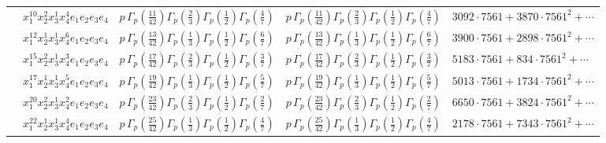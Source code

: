 \documentclass[11pt]{article}
\begin{document}
\begin{table}[ht]
{\begin{tabular}{@{}lllll@{}}
 & $x_{1}^{10} x_{2}^{2} x_{3}^{1} x_{4}^{4}  e_{1} e_{2} e_{3} e_{4}$ & $p \, \Gamma_p \left( \frac{11}{42} \right) \Gamma_p \left( \frac{2}{3} \right) \Gamma_p \left( \frac{1}{2} \right) \Gamma_p \left( \frac{4}{7} \right)$ & $p \, \Gamma_p \left( \frac{11}{42} \right) \Gamma_p \left( \frac{2}{3} \right) \Gamma_p \left( \frac{1}{2} \right) \Gamma_p \left( \frac{4}{7} \right)$ & $3092{\cdot}7561{+}3870{\cdot}7561^{2}{+}\cdots$ \\
 & $x_{1}^{12} x_{2}^{1} x_{3}^{1} x_{4}^{6}  e_{1} e_{2} e_{3} e_{4}$ & $p \, \Gamma_p \left( \frac{13}{42} \right) \Gamma_p \left( \frac{1}{3} \right) \Gamma_p \left( \frac{1}{2} \right) \Gamma_p \left( \frac{6}{7} \right)$ & $p \, \Gamma_p \left( \frac{13}{42} \right) \Gamma_p \left( \frac{1}{3} \right) \Gamma_p \left( \frac{1}{2} \right) \Gamma_p \left( \frac{6}{7} \right)$ & $3900{\cdot}7561{+}2898{\cdot}7561^{2}{+}\cdots$ \\
 & $x_{1}^{15} x_{2}^{2} x_{3}^{1} x_{4}^{3}  e_{1} e_{2} e_{3} e_{4}$ & $p \, \Gamma_p \left( \frac{17}{42} \right) \Gamma_p \left( \frac{2}{3} \right) \Gamma_p \left( \frac{1}{2} \right) \Gamma_p \left( \frac{3}{7} \right)$ & $p \, \Gamma_p \left( \frac{17}{42} \right) \Gamma_p \left( \frac{2}{3} \right) \Gamma_p \left( \frac{1}{2} \right) \Gamma_p \left( \frac{3}{7} \right)$ & $5183{\cdot}7561{+}834{\cdot}7561^{2}{+}\cdots$ \\
 & $x_{1}^{17} x_{2}^{1} x_{3}^{1} x_{4}^{5}  e_{1} e_{2} e_{3} e_{4}$ & $p \, \Gamma_p \left( \frac{19}{42} \right) \Gamma_p \left( \frac{1}{3} \right) \Gamma_p \left( \frac{1}{2} \right) \Gamma_p \left( \frac{5}{7} \right)$ & $p \, \Gamma_p \left( \frac{19}{42} \right) \Gamma_p \left( \frac{1}{3} \right) \Gamma_p \left( \frac{1}{2} \right) \Gamma_p \left( \frac{5}{7} \right)$ & $5013{\cdot}7561{+}1734{\cdot}7561^{2}{+}\cdots$ \\
 & $x_{1}^{20} x_{2}^{2} x_{3}^{1} x_{4}^{2}  e_{1} e_{2} e_{3} e_{4}$ & $p \, \Gamma_p \left( \frac{23}{42} \right) \Gamma_p \left( \frac{2}{3} \right) \Gamma_p \left( \frac{1}{2} \right) \Gamma_p \left( \frac{2}{7} \right)$ & $p \, \Gamma_p \left( \frac{23}{42} \right) \Gamma_p \left( \frac{2}{3} \right) \Gamma_p \left( \frac{1}{2} \right) \Gamma_p \left( \frac{2}{7} \right)$ & $6650{\cdot}7561{+}3824{\cdot}7561^{2}{+}\cdots$ \\
 & $x_{1}^{22} x_{2}^{1} x_{3}^{1} x_{4}^{4}  e_{1} e_{2} e_{3} e_{4}$ & $p \, \Gamma_p \left( \frac{25}{42} \right) \Gamma_p \left( \frac{1}{3} \right) \Gamma_p \left( \frac{1}{2} \right) \Gamma_p \left( \frac{4}{7} \right)$ & $p \, \Gamma_p \left( \frac{25}{42} \right) \Gamma_p \left( \frac{1}{3} \right) \Gamma_p \left( \frac{1}{2} \right) \Gamma_p \left( \frac{4}{7} \right)$ & $2178{\cdot}7561{+}7343{\cdot}7561^{2}{+}\cdots$ \\

\end{tabular}}
\end{table}
\end{document}
